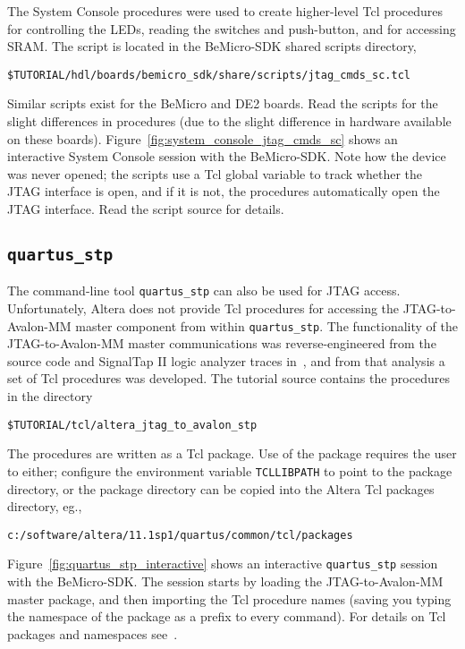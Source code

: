 \documentclass[10pt,twoside]{article}
\begin{document}
The System Console procedures were used to create higher-level
Tcl procedures for controlling the LEDs, reading the switches
and push-button, and for accessing SRAM. The script is located
in the BeMicro-SDK shared scripts directory,
%
\begin{verbatim}
$TUTORIAL/hdl/boards/bemicro_sdk/share/scripts/jtag_cmds_sc.tcl
\end{verbatim}
%
Similar scripts exist for the BeMicro and DE2 boards. Read the
scripts for the slight differences in procedures (due to the
slight difference in hardware available on these boards).
Figure~\ref{fig:system_console_jtag_cmds_sc} shows an
interactive System Console session with the BeMicro-SDK.
Note how the device
was never opened; the scripts use a Tcl global variable to track
whether the JTAG interface is open, and if it is not, the procedures
automatically open the JTAG interface. Read the script source
for details.

\subsection{\tt quartus\_stp}
%
The command-line tool \verb+quartus_stp+ can also be used for
JTAG access. Unfortunately, Altera does not provide Tcl procedures
for accessing the JTAG-to-Avalon-MM master component from within
\verb+quartus_stp+. The functionality of the JTAG-to-Avalon-MM 
master communications was reverse-engineered from the source 
code and SignalTap II logic analyzer traces 
in~\cite{Hawkins_Altera_JTAG_to_Avalon_Analysis_2012}, and
from that analysis a set of Tcl procedures was developed.
The tutorial source contains the procedures in the directory 
%
\begin{verbatim}
$TUTORIAL/tcl/altera_jtag_to_avalon_stp
\end{verbatim}
%
The procedures are written as a Tcl package.
Use of the package requires the user to either; configure the
environment variable \verb+TCLLIBPATH+ to point to the 
package directory, or the package directory can be copied into 
the Altera Tcl packages directory, eg.,
%
\begin{verbatim}
c:/software/altera/11.1sp1/quartus/common/tcl/packages
\end{verbatim}
%
Figure~\ref{fig:quartus_stp_interactive} shows an
interactive \verb+quartus_stp+ session with the BeMicro-SDK.
The session starts by loading the JTAG-to-Avalon-MM master
package, and then importing the Tcl procedure names
(saving you typing the namespace of the package as a prefix
to every command). For details on Tcl packages and
namespaces see~\cite{Welch_2000}.
\end{document}

